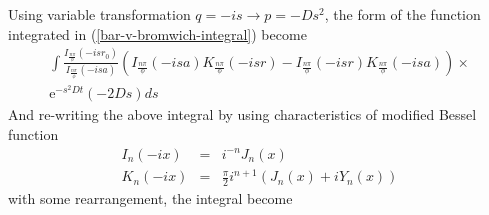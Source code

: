 \documentclass{article}
\begin{document}
Using variable transformation $q = -is \to p = -Ds^2$, the form of the function integrated 
in (\ref{bar-v-bromwich-integral}) become
\begin{eqnarray}
    \int\frac{I_{\frac{n\pi}{\phi}}(-isr_0)}{I_{\frac{n\pi}{\phi}}(-isa)}
    (I_{\frac{n\pi}{\phi}}(-isa)K_{\frac{n\pi}{\phi}}(-isr) -
     I_{\frac{n\pi}{\phi}}(-isr)K_{\frac{n\pi}{\phi}}(-isa)) \times\nonumber \\
    \mathrm{e}^{-s^2Dt}(-2Ds)ds
\end{eqnarray}
And re-writing the above integral by using characteristics of modified Bessel function
\begin{eqnarray}
    I_n(-ix) &=& i^{-n}J_n(x)\nonumber \\
    K_n(-ix) &=& \frac{\pi}{2}i^{n+1}(J_n(x)+iY_n(x))\nonumber
\end{eqnarray}
with some rearrangement, the integral become
\end{document}
